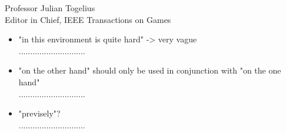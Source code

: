 \documentclass[10pt]{letter} %
\begin{document}
\begin{letter}{Professor Julian Togelius \\ Editor in Chief, IEEE Transactions on Games}
\begin{enumerate}
\begin{itemize}
\begin{itemize}
				\item 	"in this environment is quite hard" -> very vague\\
.............................

				\item 	"on the other hand" should only be used in conjunction with "on the one hand"\\
.............................
				\item 	"previsely"?\\
.............................
			
			\end{itemize}
	
\end{itemize}
\end{enumerate}
 






\end{letter}
 
\end{document}
